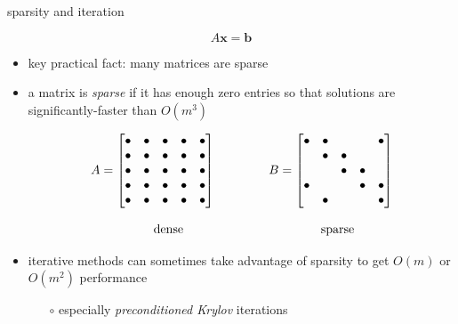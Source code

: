\documentclass[usepdftitle=false,usenames,dvipsnames]{beamer}
\newcommand{\bb}{\mathbf{b}}
\newcommand{\bx}{\mathbf{x}}
\begin{document}
\begin{frame}{sparsity and iteration}

$$A \bx = \bb$$

\begin{itemize}
\item key practical fact: many matrices are sparse
\item a matrix is \emph{sparse} if it has enough zero entries so that solutions are significantly-faster than $O(m^3)$

{\scriptsize
   $$A = \begin{bmatrix} \bullet & \bullet & \bullet & \bullet & \bullet \\ \bullet & \bullet & \bullet & \bullet & \bullet \\ \bullet & \bullet & \bullet & \bullet & \bullet \\ \bullet & \bullet & \bullet & \bullet & \bullet \\ \bullet & \bullet & \bullet & \bullet & \bullet\end{bmatrix} \hspace{15mm}
   B = \begin{bmatrix} \bullet & \bullet & & & \bullet \\ & \bullet & \bullet & & \\  &  & \bullet & \bullet & \\ \bullet & & & \bullet & \bullet \\ & \bullet & & & \bullet \end{bmatrix}$$

\vspace{-2mm}
$$\qquad \text{dense} \hspace{39mm} \text{sparse}$$
}

\item iterative methods can sometimes take advantage of sparsity to get $O(m)$ or $O(m^2)$ performance
    \begin{itemize}
    \item[$\circ$] especially \emph{preconditioned Krylov} iterations
    \end{itemize}
\end{itemize}
\end{frame}
\end{document}
